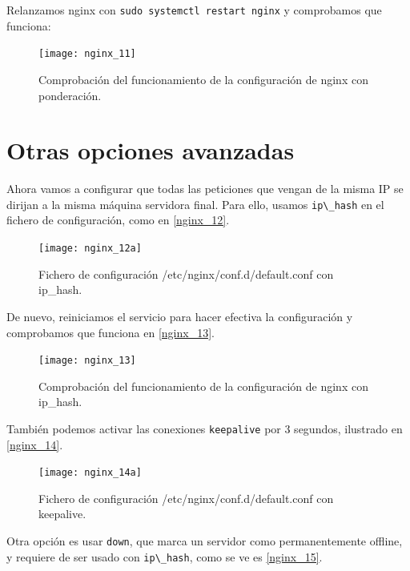 Relanzamos nginx con \verb|sudo systemctl restart nginx| y comprobamos que funciona:

\begin{figure}[h!]
\begin{center}
\caption{Comprobación del funcionamiento de la configuración de nginx con ponderación.}
\label{nginx_11}
\texttt{[image: nginx\_11]}
\end{center}
\end{figure}

\section{Otras opciones avanzadas}

Ahora vamos a configurar que todas las peticiones que vengan de la misma IP se dirijan a la misma máquina servidora final. Para ello, usamos \verb|ip\_hash| en el fichero de configuración, como en \eqref{nginx_12}.

\begin{figure}[h!]
\begin{center}
\caption{Fichero de configuración /etc/nginx/conf.d/default.conf con ip\_hash.}
\label{nginx_12}
\texttt{[image: nginx\_12a]}
\end{center}
\end{figure}

De nuevo, reiniciamos el servicio para hacer efectiva la configuración y comprobamos que funciona en \eqref{nginx_13}.

\begin{figure}[h!]
\begin{center}
\caption{Comprobación del funcionamiento de la configuración de nginx con ip\_hash.}
\label{nginx_13}
\texttt{[image: nginx\_13]}
\end{center}
\end{figure}

También podemos activar las conexiones \verb|keepalive| por 3 segundos, ilustrado en \eqref{nginx_14}.

\begin{figure}[h!]
\begin{center}
\caption{Fichero de configuración /etc/nginx/conf.d/default.conf con keepalive.}
\label{nginx_14}
\texttt{[image: nginx\_14a]}
\end{center}
\end{figure}

Otra opción es usar \verb|down|, que marca un servidor como permanentemente offline, y requiere de ser usado con \verb|ip\_hash|, como se ve es \eqref{nginx_15}.

